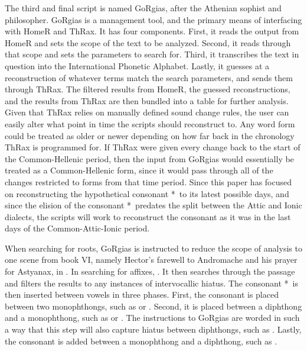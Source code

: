 The third and final script is named GoRgias, after the Athenian sophist and philosopher. GoRgias is a management tool, and the primary means of interfacing with HomeR and ThRax. It has four components. First, it reads the output from HomeR and sets the scope of the text to be analyzed. Second, it reads through that scope and sets the parameters to search for. Third, it transcribes the text in question into the International Phonetic Alphabet. Lastly, it guesses at a reconstruction of whatever terms match the search parameters, and sends them through ThRax. The filtered results from HomeR, the guessed reconstructions, and the results from ThRax are then bundled into a table for further analysis. Given that ThRax relies on manually defined sound change rules, the user can easily alter what point in time the scripts should reconstruct to. Any word form could be treated as older or newer depending on how far back in the chronology ThRax is programmed for. If ThRax were given every change back to the start of the Common-Hellenic period, then the input from GoRgias would essentially be treated as a Common-Hellenic form, since it would pass through all of the changes restricted to forms from that time period.  Since this paper has focused on reconstructing the hypothetical consonant *\w\ to its latest possible days, and since the elision of the consonant *\w\ predates the split between the Attic and Ionic dialects, the scripts will work to reconstruct the consonant as it was in the last days of the Common-Attic-Ionic period. 

 When searching for roots, GoRgias is instructed to reduce the scope of analysis to one scene from book VI, namely  Hector's farewell to Andromache and his prayer for Astyanax, in . In searching for affixes, . It then searches through the passage and filters the results to any instances of intervocallic hiatus. The consonant *\w\ is then inserted between vowels in three phases. First, the consonant is placed between two monophthongs, such as  or . Second, it is placed between a diphthong and a monophthong, such as  or . The instructions to GoRgias are worded in such a way that this step will also capture hiatus between diphthongs, such as . Lastly, the consonant is added between a monophthong and a diphthong, such as . 

